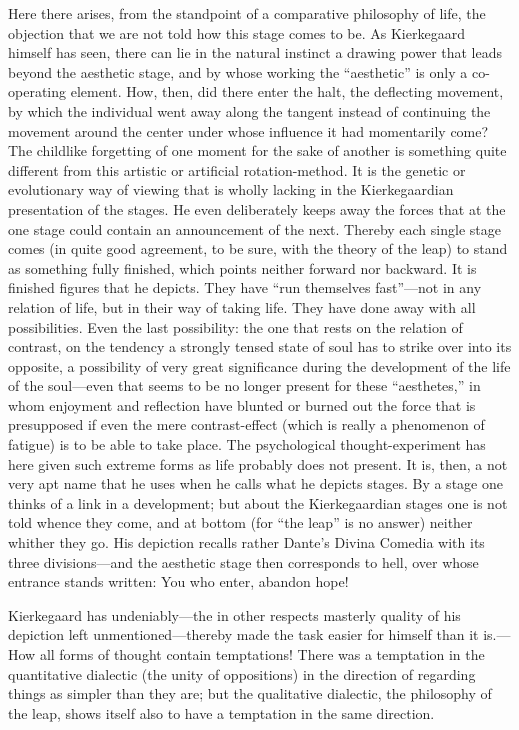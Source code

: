 \documentclass[12pt,a4paper]{book}
\newcommand{\opage}[1]{\marginnote{\footnotesize\textit{[#1]}}}
\begin{document}
Here there arises, from the standpoint of a comparative philosophy of
life, the objection that we are not told how this stage comes to be. As
Kierkegaard himself has seen, there can lie in the natural instinct a
drawing power that leads beyond the aesthetic stage, and by whose working
the ``aesthetic'' is only a co-operating element. How, then, did there
enter the halt, the deflecting movement, by which the individual went away
along the tangent instead of continuing the movement around the center
under whose influence it had momentarily come? The childlike forgetting of
one moment for the sake of another is something quite different from this
artistic or artificial rotation-method. It is the genetic or evolutionary
way of viewing that is wholly lacking in the Kierkegaardian presentation of
the stages. He even deliberately keeps away the forces that at the one
stage could contain an announcement of the next. Thereby each single stage
comes (in quite good agreement, to be sure, with the theory of the leap) to
stand as something fully finished, which points neither forward nor
backward. It is finished figures that he depicts. They have ``run
themselves fast''---not in any relation of life, but in their way of
taking life. They have done away with all possibilities. Even the last
possibility: the one that rests on the relation of contrast, on the
tendency a strongly tensed state of soul has to strike over into its
opposite, a possibility of very great significance during the development
of the life of the soul---even that seems to be no longer present for
these ``aesthetes,'' in whom enjoyment and reflection have blunted or
burned out the force that
\opage{90}is presupposed if even the mere contrast-effect (which is really
a phenomenon of fatigue) is to be able to take place. The psychological
thought-experiment has here given such extreme forms as life probably does
not present. It is, then, a not very apt name that he uses when he calls
what he depicts stages. By a stage one thinks of a link in a development;
but about the Kierkegaardian stages one is not told whence they come, and
at bottom (for ``the leap'' is no answer) neither whither they go. His
depiction recalls rather Dante's Divina Comedia with its three
divisions---and the aesthetic stage then corresponds to hell, over whose
entrance stands written: You who enter, abandon hope!

Kierkegaard has undeniably---the in other respects masterly quality of his
depiction left unmentioned---thereby made the task easier for himself than
it is.---How all forms of thought contain temptations! There was a
temptation in the quantitative dialectic (the unity of oppositions) in the
direction of regarding things as simpler than they are; but the
qualitative dialectic, the philosophy of the leap, shows itself also to
have a temptation in the same direction.
\end{document}
